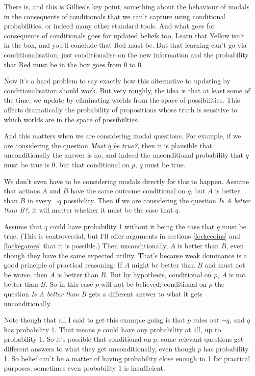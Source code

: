 \documentclass[11pt,]{book}
\begin{document}
There is, and this is Gillies's key point, something about the behaviour of modals in the consequents of conditionals that we can't capture using conditional probabilities, or indeed many other standard tools. And what goes for consequents of conditionals goes for updated beliefs too. Learn that Yellow isn't in the box, and you'll conclude that Red must be. But that learning can't go via conditionalisation; just conditionalise on the new information and the probability that Red must be in the box goes from 0 to 0.

Now it's a hard problem to say exactly how this alternative to updating by conditionalisation should work. But very roughly, the idea is that at least some of the time, we update by eliminating worlds from the space of possibilities. This affects dramatically the probability of propositions whose truth is sensitive to which worlds are in the space of possibiilties.

And this matters when we are considering modal questions. For example, if we are considering the question \emph{Must q be true?}, then it is plausible that unconditionally the answer is no, and indeed the unconditional probability that \(q\) must be true is 0, but that conditional on \(p\), \(q\) must be true.

We don't even have to be considering modals directly for this to happen. Assume that actions \(A\) and \(B\) have the same outcome conditional on \(q\), but \(A\) is better than \(B\) in every \(\neg q\) possibility. Then if we are considering the question \emph{Is A better than B?}, it will matter whether it must be the case that \(q\).

Assume that \(q\) could have probability 1 without it being the case that \(q\) must be true. (This is controversial, but I'll offer arguments in sections \ref{lockecoins} and \ref{lockegames} that it is possible.) Then unconditionally, \(A\) is better than \(B\), even though they have the same expected utility. That's because weak dominance is a good principle of practical reasoning: If \(A\) might be better than \(B\) and must not be worse, then \(A\) is better than \(B\). But by hypothesis, conditional on \(p\), \(A\) is not better than \(B\). So in this case \(p\) will not be believed; conditional on \(p\) the question \emph{Is A better than B} gets a different answer to what it gets unconditionally.

Note though that all I said to get this example going is that \(p\) rules out \(\neg q\), and \(q\) has probability 1. That means \(p\) could have any probability at all, up to probability 1. So it's possible that conditional on \(p\), some relevant questions get different answers to what they get unconditionally, even though \(p\) has probability 1. So belief can't be a matter of having probability close enough to 1 for practical purposes; sometimes even probability 1 is insufficient.
\end{document}
